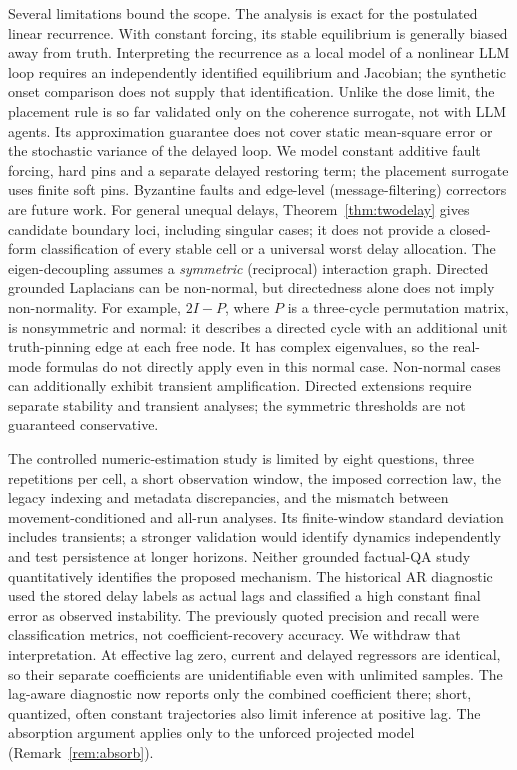 \documentclass[11pt]{article}
\theoremstyle{definition}
\begin{document}
Several limitations bound the scope. The analysis is exact for the postulated linear recurrence.
With constant forcing, its stable equilibrium is generally biased away from truth. Interpreting the
recurrence as a local model of a nonlinear LLM loop requires an independently identified equilibrium
and Jacobian; the synthetic onset comparison does not supply that identification. Unlike the dose limit, the placement rule is so far validated only on the coherence surrogate, not with LLM agents. Its approximation guarantee does not cover static mean-square error or the stochastic variance of the delayed loop.
We model constant additive fault forcing, hard pins and a separate delayed restoring term;
the placement surrogate uses finite soft pins. Byzantine faults and
edge-level (message-filtering) correctors are future work. For general unequal delays,
Theorem~\ref{thm:twodelay} gives candidate boundary loci, including singular cases; it does not provide
a closed-form classification of every stable cell or a universal worst delay allocation.
The eigen-decoupling assumes a \emph{symmetric} (reciprocal) interaction graph. Directed grounded
Laplacians can be non-normal, but directedness alone does not imply non-normality. For example,
$2I-P$, where $P$ is a three-cycle permutation matrix, is nonsymmetric and normal: it describes a
directed cycle with an additional unit truth-pinning edge at each free node. It has complex
eigenvalues, so the real-mode formulas do not directly apply even in this normal case.
Non-normal cases can additionally exhibit transient amplification. Directed extensions require
separate stability and transient analyses; the symmetric thresholds are not guaranteed conservative.

The controlled numeric-estimation study is limited by eight questions, three repetitions per cell,
a short observation window, the imposed correction law, the legacy indexing and metadata discrepancies,
and the mismatch between movement-conditioned and all-run analyses. Its finite-window standard
deviation includes transients; a stronger validation would identify dynamics independently and test
persistence at longer horizons. Neither grounded factual-QA
study quantitatively identifies the proposed mechanism. The historical AR diagnostic used the
stored delay labels as actual lags and classified a high constant final error as observed instability.
The previously quoted precision and recall were classification metrics, not coefficient-recovery
accuracy. We withdraw that interpretation. At effective lag zero, current and delayed regressors
are identical, so their separate coefficients are unidentifiable even with unlimited samples.
The lag-aware diagnostic now reports only the combined coefficient there; short, quantized,
often constant trajectories also limit inference at positive lag. The absorption argument applies
only to the unforced projected model (Remark~\ref{rem:absorb}).
\end{document}
